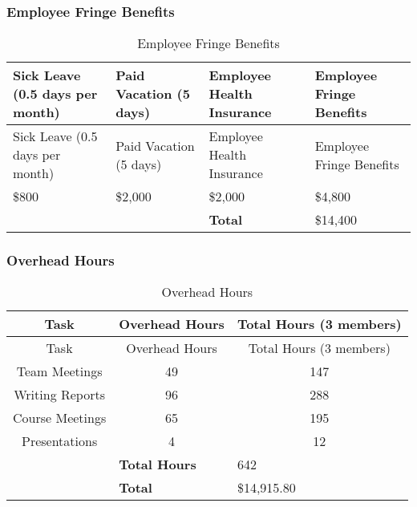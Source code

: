 \subsubsection{Employee Fringe Benefits}
\begin{center}
\setlength{\extrarowheight}{1.5pt}
  \begin{longtable}{|p{3cm}|p{3cm}|p{3cm}|p{3cm}|}
 \caption{Employee Fringe Benefits} \\
   \hline
  
  \centering Sick Leave (0.5 days per month) & Paid Vacation (5 days) & Employee Health Insurance & Employee Fringe Benefits \\
  \hline \hline \endfirsthead
  
     \hline

	\centering Sick Leave (0.5 days per month) & Paid Vacation (5 days) & Employee Health Insurance & Employee Fringe Benefits \\
	\hline \hline \endhead
  
  \endfoot  

    \$800 & \$2,000 & \$2,000 & \$4,800  \\ \hline
    \multicolumn{1}{l}{}      & \multicolumn{1}{l}{}      & \multicolumn{1}{l}{\textbf{Total}} & \multicolumn{1}{l}{\$14,400}  \\
          
           \end{longtable}
\end{center}

\subsubsection{Overhead Hours}

\begin{center}
\setlength{\extrarowheight}{1.5pt}
  \begin{longtable}{|c|c|c|}
 \caption{Overhead Hours\label{overheadHours}} \\
   \hline
  
  \centering Task & Overhead Hours & Total Hours (3 members) \\
  \hline \hline \endfirsthead
  
     \hline

	\centering Task & Overhead Hours & Total Hours (3 members) \\
	\hline \hline \endhead

 \endfoot  

	Team Meetings & 49 & 147 \\ \hline
	Writing Reports & 96 & 288 \\ \hline
	Course Meetings & 65 & 195 \\ \hline	  
	Presentations & 4 & 12 \\ \hline
  \multicolumn{1}{l}{}      & \multicolumn{1}{l}{\textbf{Total Hours}} & \multicolumn{1}{l}{642}  \\
  \multicolumn{1}{l}{}      & \multicolumn{1}{l}{\textbf{Total}} & \multicolumn{1}{l}{\$14,915.80}  \\
    \end{longtable}
\end{center}

